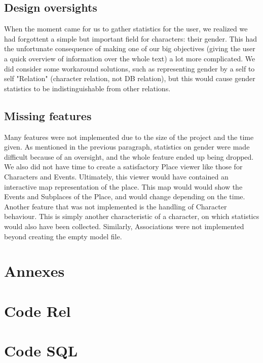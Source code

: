 \documentclass[a4paper ,12pt,french]{article}
\begin{document}
\subsection{Design oversights}
When the moment came for us to gather statistics for the user, we realized we had forgottent a simple but important field for characters: their gender. This had the unfortunate consequence of making one of our big objectives (giving the user a quick overview of information over the whole text) a lot more complicated.
We did consider some workaround solutions, such as representing gender by a self to self "Relation" (character relation, not DB relation), but this would cause gender statistics to be indistinguishable from other relations.

\subsection{Missing features}
Many features were not implemented due to the size of the project and the time given. As mentioned in the previous paragraph, statistics on gender were made difficult because of an oversight, and the whole feature  ended up being dropped. We also did not have time to create a satisfactory Place viewer like those for Characters and Events. Ultimately, this viewer would have contained an interactive map representation of the place. This map would would show the Events and Subplaces of the Place, and would change depending on the time.
Another feature that was not implemented is the handling of Character behaviour. This is simply another characteristic of a character, on which statistics would also have been collected. Similarly, Associations were not implemented beyond creating the empty model file.

\section*{Annexes}
\appendix

\section{Code Rel}

\newpage
\section{Code SQL}

\end{document}
